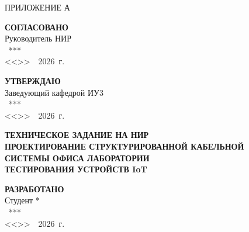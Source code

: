 \documentclass{bmstu}
\newcommand{\blank}[1][1.5cm]{\underline{\hspace{#1}}}
\begin{document}
\cleardoublepage
\begin{appendices}
{}

\begin{titlepage}
    \thispagestyle{empty}
    \begin{flushright}
    ПРИЛОЖЕНИЕ А
    \end{flushright}

    \vspace*{0pt}
    \noindent
    \begin{minipage}[t]{0.48\textwidth}
        \raggedright
        \textbf{СОГЛАСОВАНО}\\[6pt]
        Руководитель НИР\\[10pt]
        \blank[3cm]~***\\[6pt]
        <<\blank[0.6cm]>>~\blank[2.5cm]~2026~г.
    \end{minipage}%
    \hfill
    \begin{minipage}[t]{0.48\textwidth}
        \raggedright
        \textbf{УТВЕРЖДАЮ}\\[6pt]
        Заведующий кафедрой ИУ3\\[10pt]
        \blank[3cm]~***\\[6pt]
        <<\blank[0.6cm]>>~\blank[2.5cm]~2026~г.
    \end{minipage}

    \vfill
    \begin{center}
        {\LARGE \bfseries ТЕХНИЧЕСКОЕ ЗАДАНИЕ НА НИР}\\[8mm]
        {\Large \bfseries
        ПРОЕКТИРОВАНИЕ СТРУКТУРИРОВАННОЙ КАБЕЛЬНОЙ\\
        СИСТЕМЫ ОФИСА ЛАБОРАТОРИИ\\
        ТЕСТИРОВАНИЯ УСТРОЙСТВ IoT}
    \end{center}
    \vfill

    \noindent
    \textbf{РАЗРАБОТАНО}\\[6pt]
    Студент *\\[10pt]
    \blank[3cm]~***\\[6pt]
    <<\blank[0.6cm]>>~\blank[2.5cm]~2026~г.

    \vspace{20mm}


\end{titlepage}
\end{appendices}
\end{document}
